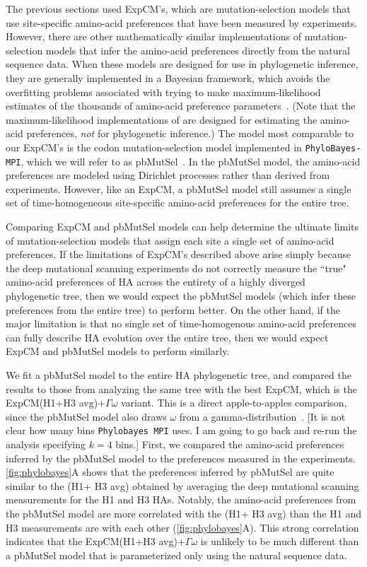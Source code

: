 \documentclass[11pt]{article}
\newcommand\skhcomment[1]{{\color{cyan}[#1]}}
\begin{document}
The previous sections used ExpCM's, which are mutation-selection models that use site-specific amino-acid preferences that have been measured by experiments. 
However, there are other mathematically similar implementations of mutation-selection models that infer the amino-acid preferences directly from the natural sequence data. 
When these models are designed for use in phylogenetic inference, they are generally implemented in a Bayesian framework, which avoids the overfitting problems associated with trying to make maximum-likelihood estimates of the thousands of amino-acid preference parameters~\citep{lartillot2014overcoming}.
(Note that the maximum-likelihood implementations of \citet{tamuri2012estimating,tamuri2014penalized} are designed for estimating the amino-acid preferences, \emph{not} for phylogenetic inference.)
The model most comparable to our ExpCM's is the codon mutation-selection model implemented in \texttt{PhyloBayes-MPI}, which we will refer to as pbMutSel~\citep{rodrigue2014site}. 
In the pbMutSel model, the amino-acid preferences are modeled using Dirichlet processes rather than derived from experiments. 
However, like an ExpCM, a pbMutSel model still assumes a single set of time-homogeneous site-specific amino-acid preferences for the entire tree.

Comparing ExpCM and pbMutSel models can help determine the ultimate limits of mutation-selection models that assign each site a single set of amino-acid preferences. 
If the limitations of ExpCM's described above arise simply because the deep mutational scanning experiments do not correctly measure the ``true" amino-acid preferences of HA across the entirety of a highly diverged phylogenetic tree, then we would expect the pbMutSel models (which infer these preferences from the entire tree) to perform better.
On the other hand, if the major limitation is that no single set of time-homogenous amino-acid preferences can fully describe HA evolution over the entire tree, then we would expect ExpCM and pbMutSel models to perform similarly.

We fit a pbMutSel model to the entire HA phylogenetic tree, and compared the results to those from analyzing the same tree with the best ExpCM, which is the ExpCM(H1+H3 avg)+$\Gamma\omega$ variant.
This is a direct apple-to-apples comparison, since the pbMutSel model also draws $\omega$ from a gamma-distribution~\citep{rodrigue2014site}.
\skhcomment{It is not clear how many bins \texttt{Phylobayes MPI} uses. I am going to go back and re-run the analysis specifying $k=4$ bins.}
First, we compared the amino-acid preferences inferred by the pbMutSel model to the preferences measured in the experiments.
\ref{fig:phylobayes}A shows that the preferences inferred by pbMutSel are quite similar to the (H1+ H3 avg) obtained by averaging the deep mutational scanning measurements for the H1 and H3 HAs. 
Notably, the amino-acid preferences from the pbMutSel model are more correlated with the (H1+ H3 avg) than the H1 and H3 measurements are with each other (\ref{fig:phylobayes}A).
This strong correlation indicates that the ExpCM(H1+H3 avg)+$\Gamma\omega$ is unlikely to be much different than a pbMutSel model that is parameterized only using the natural sequence data.  
\end{document}
